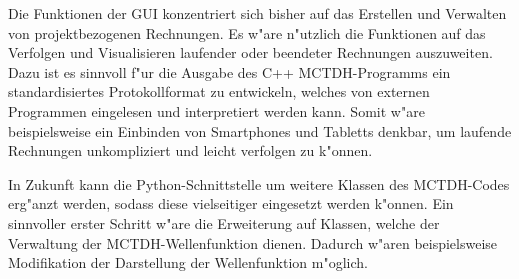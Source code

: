 Die Funktionen der GUI konzentriert sich bisher auf das Erstellen und Verwalten von
projektbezogenen Rechnungen. Es w"are n"utzlich die Funktionen auf das Verfolgen und Visualisieren
laufender oder beendeter Rechnungen auszuweiten. Dazu ist es sinnvoll f"ur die Ausgabe des C++ 
MCTDH-Programms ein standardisiertes Protokollformat zu entwickeln, welches von externen Programmen eingelesen
und interpretiert werden kann. Somit w"are beispielsweise ein Einbinden von Smartphones und Tabletts
denkbar, um laufende Rechnungen unkompliziert und leicht verfolgen zu k"onnen.

In Zukunft kann die Python-Schnittstelle um weitere Klassen des MCTDH-Codes erg"anzt werden, sodass diese
vielseitiger eingesetzt werden k"onnen. Ein sinnvoller erster Schritt w"are die Erweiterung auf Klassen,
welche der Verwaltung der MCTDH-Wellenfunktion dienen. Dadurch w"aren beispielsweise Modifikation der
Darstellung der Wellenfunktion m"oglich.
